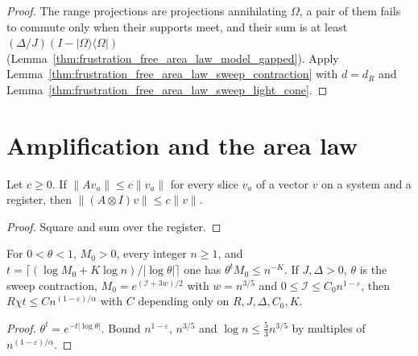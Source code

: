 \begin{proof}\leanok
    The range projections are projections annihilating $\Omega$, a pair of
    them fails to commute only when their supports meet, and their sum is at
    least $(\Delta/J)(I-|\Omega\rangle\langle\Omega|)$
    (Lemma~\ref{thm:frustration_free_area_law_model_gapped}). Apply
    Lemma~\ref{thm:frustration_free_area_law_sweep_contraction} with $d=d_R$ and
    Lemma~\ref{thm:frustration_free_area_law_sweep_light_cone}.
\end{proof}

\section{Amplification and the area law}
\label{sec:frustration_free_area_law_amplification}

\begin{lemma}
    \label{thm:frustration_free_area_law_spectator}
    \leanok
    Let $c\ge0$. If $\|Av_a\|\le c\|v_a\|$ for every slice $v_a$ of a vector
    $v$ on a system and a register, then $\|(A\otimes I)v\|\le c\|v\|$.
\end{lemma}

\begin{proof}\leanok
    Square and sum over the register.
\end{proof}

\begin{lemma}
    \label{thm:frustration_free_area_law_radius}
    \leanok
    For $0<\theta<1$, $M_0>0$, every integer $n\ge1$, and $t=\lceil(\log M_0+K\log n)/|\log\theta|\rceil$
    one has $\theta^tM_0\le n^{-K}$. If $J,\Delta>0$, $\theta$ is the sweep
    contraction, $M_0=e^{(\mathcal I+3w)/2}$ with $w=n^{3/5}$ and
    $0\le\mathcal I\le C_0n^{1-\varepsilon}$, then
    $R\chi t\le Cn^{(1-\varepsilon)/\alpha}$ with $C$ depending only on
    $R,J,\Delta,C_0,K$.
\end{lemma}

\begin{proof}\leanok
    $\theta^t=e^{-t|\log\theta|}$. Bound $n^{1-\varepsilon}$, $n^{3/5}$ and
    $\log n\le\tfrac53n^{3/5}$ by multiples of $n^{(1-\varepsilon)/\alpha}$.
\end{proof}

